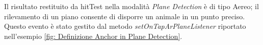 \documentclass[crop=false, class=book]{standalone}
\begin{document}
	\begin{flushleft}
		Il risultato restituito da hitTest nella modalità \emph{Plane Detection} è di tipo Aereo; il rilevamento di un piano 			consente di disporre un animale in un punto preciso. Questo evento è stato gestito dal metodo 									\textit{setOnTapArPlaneListener} riportato nell'esempio \vref{fig: Definizione Anchor in Plane Detection}.\\
	\end{flushleft}
		
	
\end{document}
